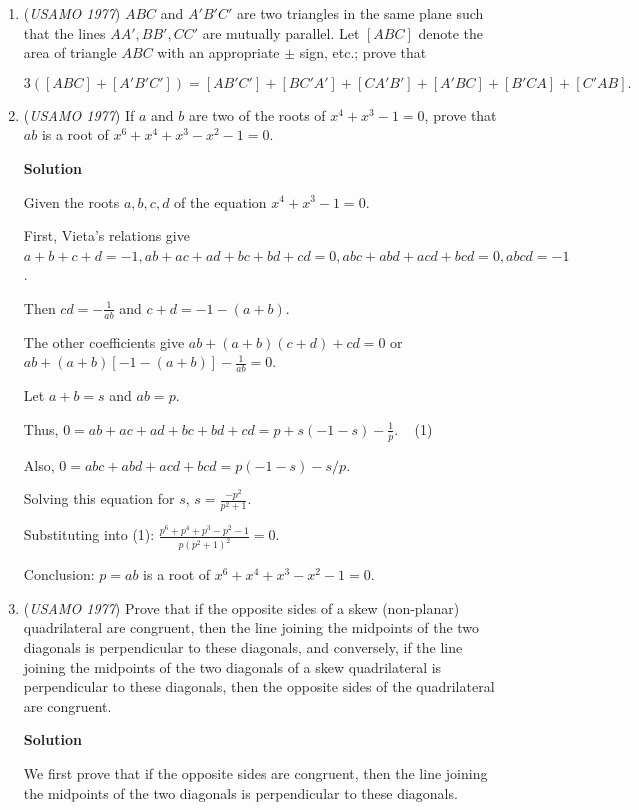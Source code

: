 \begin{enumerate}
 


	\item (\textit{USAMO 1977}) $ABC$ and $A'B'C'$ are two triangles in the same plane such that the lines $AA',BB',CC'$ are mutually parallel. Let $[ABC]$ denote the area of triangle $ABC$ with an appropriate $\pm$ sign, etc.; prove that

 \[3([ABC] + [A'B'C']) = [AB'C'] + [BC'A'] + [CA'B'] + [A'BC] + [B'CA] + [C'AB].\]



	\item (\textit{USAMO 1977}) If $a$ and $b$ are two of the roots of $x^4+x^3-1=0$, prove that $ab$ is a root of $x^6+x^4+x^3-x^2-1=0$.


 



\textbf{Solution}

Given the roots $a,b,c,d$ of the equation $x^{4}+x^{3}-1=0$.

 First, Vieta's relations give $a+b+c+d = -1 , ab+ac+ad+bc+bd+cd=0, abc+abd+acd+bcd=0, abcd = -1$.

 Then $cd=-\frac{1}{ab}$ and $c+d=-1-(a+b)$.

 The other coefficients give $ab+(a+b)(c+d)+cd = 0$ or $ab+(a+b)[-1-(a+b)]-\frac{1}{ab}=0$.

 Let $a+b=s$ and $ab=p$.

 Thus, $0=ab+ac+ad+bc+bd+cd=p+s(-1-s)-\frac{1}{p}$.   (1)

 Also, $0=abc+abd+acd+bcd=p(-1-s)-s/p$.

 Solving this equation for $s$, $s= \frac{-p^2}{p^2+1}$.

 Substituting into (1): $\frac{p^{6}+p^{4}+p^{3}-p^{2}-1}{p(p^2+1)^2}=0$.

 Conclusion: $p =ab$ is a root of $x^{6}+x^{4}+x^{3}-x^{2}-1=0$.

 


	\item (\textit{USAMO 1977}) Prove that if the opposite sides of a skew (non-planar) quadrilateral are congruent, then the line joining the midpoints of the two diagonals is perpendicular to these diagonals, and conversely, if the line joining the midpoints of the two diagonals of a skew quadrilateral is perpendicular to these diagonals, then the opposite sides of the quadrilateral are congruent.


 



\textbf{Solution}

We first prove that if the opposite sides are congruent, then the line joining the midpoints of the two diagonals is perpendicular to these diagonals.


\end{enumerate}
